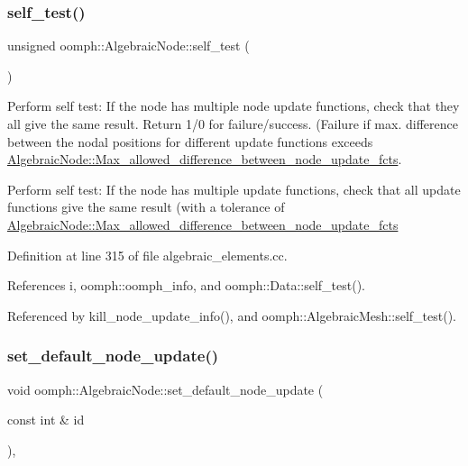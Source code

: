 \mbox{\label{classoomph_1_1AlgebraicNode_a68b0fc5d9b38bb087f889424382a3ecd}} 
\subsubsection{\texorpdfstring{self\+\_\+test()}{self\_test()}}
{\footnotesize\ttfamily unsigned oomph\+::\+Algebraic\+Node\+::self\+\_\+test (\begin{DoxyParamCaption}{ }\end{DoxyParamCaption})}



Perform self test\+: If the node has multiple node update functions, check that they all give the same result. Return 1/0 for failure/success. (Failure if max. difference between the nodal positions for different update functions exceeds \hyperlink{classoomph_1_1AlgebraicNode_a5696d589c11a229f402d68476c7fe435}{Algebraic\+Node\+::\+Max\+\_\+allowed\+\_\+difference\+\_\+between\+\_\+node\+\_\+update\+\_\+fcts}. 

Perform self test\+: If the node has multiple update functions, check that all update functions give the same result (with a tolerance of \hyperlink{classoomph_1_1AlgebraicNode_a5696d589c11a229f402d68476c7fe435}{Algebraic\+Node\+::\+Max\+\_\+allowed\+\_\+difference\+\_\+between\+\_\+node\+\_\+update\+\_\+fcts} 

Definition at line 315 of file algebraic\+\_\+elements.\+cc.



References i, oomph\+::oomph\+\_\+info, and oomph\+::\+Data\+::self\+\_\+test().



Referenced by kill\+\_\+node\+\_\+update\+\_\+info(), and oomph\+::\+Algebraic\+Mesh\+::self\+\_\+test().

\mbox{\label{classoomph_1_1AlgebraicNode_a5f9d80a2826974b63376a4c58e0812fc}} 
\subsubsection{\texorpdfstring{set\+\_\+default\+\_\+node\+\_\+update()}{set\_default\_node\_update()}}
{\footnotesize\ttfamily void oomph\+::\+Algebraic\+Node\+::set\+\_\+default\+\_\+node\+\_\+update (\begin{DoxyParamCaption}\item[{const int \&}]{id }\end{DoxyParamCaption})\hspace{0.3cm}{\ttfamily [inline]}, {\ttfamily [private]}}



